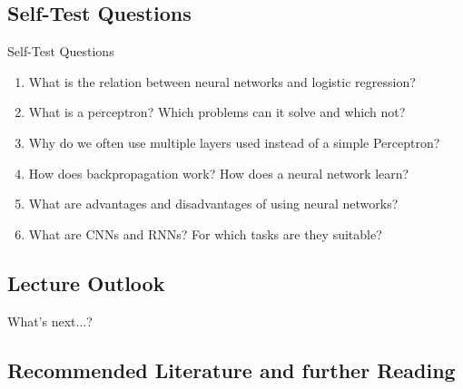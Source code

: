 \subsection{Self-Test Questions}

\begin{frame}{Self-Test Questions}{}\important
	\begin{enumerate}
		\item What is the relation between neural networks and logistic regression?
		\item What is a perceptron? Which problems can it solve and which not?
		\item Why do we often use multiple layers used instead of a simple Perceptron?
		\item How does backpropagation work? How does a neural network learn?
		\item What are advantages and disadvantages of using neural networks?
		\item What are CNNs and RNNs? For which tasks are they suitable?
	\end{enumerate}
\end{frame}


\subsection{Lecture Outlook}

\begin{frame}{What's next...?}{}
\end{frame}


\subsection{Recommended Literature and further Reading}

